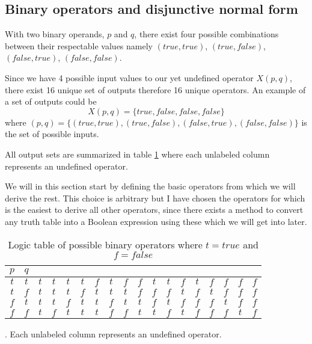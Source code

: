         \subsection{Binary operators and disjunctive normal form}
        
            With two binary operands, $p$ and $q$, there exist four possible combinations between their respectable values namely $(true, true)$, $(true, false)$, $(false, true)$, $(false, false)$.
            
            Since we have 4 possible input values to our yet undefined operator $X(p, q)$, there exist 16 unique set of outputs therefore 16 unique operators. An example of a set of outputs could be 
            \begin{equation}
                X(p, q) =\{true, false, false, false\}
            \end{equation}
            where $(p, q) = \{(true, true), (true, false), (false, true), (false, false)\}$ is the set of possible inputs. 
            
            All output sets are summarized in table \ref{LogicTable:PossibleOperators} where each unlabeled column represents an undefined operator. 
            
            We will in this section start by defining the basic operators from which we will derive the rest. This choice is arbitrary but I have chosen the operators for which is the easiest to derive all other operators, since there exists a method to convert any truth table into a Boolean expression using these which we will get into later. 
            
            \begin{table}[h!]
                \centering
                \begin{tabular}{|c|c||c|c|c|c|c|c|c|c|c|c|c|c|c|c|c|c|}
                	\hline
                	$p$ & $q$ &     &     &     &     &     &     &     &     &     &     &     &     &     &     &     &     \\ \hline
                	$t$ & $t$ & $t$ & $t$ & $t$ & $t$ & $f$ & $t$ & $f$ & $f$ & $t$ & $t$ & $f$ & $t$ & $f$ & $f$ & $f$ & $f$ \\ \hline
                	$t$ & $f$ & $t$ & $t$ & $t$ & $f$ & $t$ & $t$ & $t$ & $f$ & $f$ & $f$ & $t$ & $f$ & $t$ & $f$ & $f$ & $f$ \\ \hline
                	$f$ & $t$ & $t$ & $t$ & $f$ & $t$ & $t$ & $f$ & $t$ & $t$ & $f$ & $t$ & $f$ & $f$ & $f$ & $t$ & $f$ & $f$ \\ \hline
                	$f$ & $f$ & $t$ & $f$ & $t$ & $t$ & $t$ & $f$ & $f$ & $t$ & $t$ & $f$ & $t$ & $f$ & $f$ & $f$ & $t$ & $f$ \\ \hline
                \end{tabular} 
                \caption{Logic table of possible binary operators where $t=true$ and $f=false$}. Each unlabeled column represents an undefined operator.
                \label{LogicTable:PossibleOperators}
            \end{table}
        
